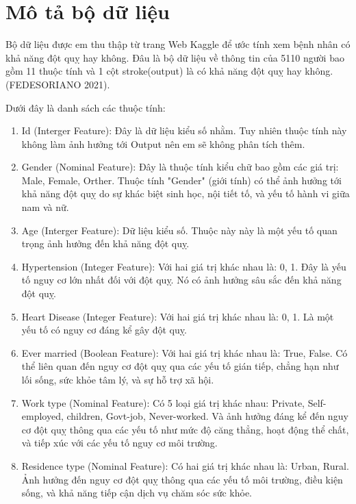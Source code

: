 \documentclass[11pt]{article}
\begin{document}
	
	\pagebreak
		
	
	\section{Mô tả bộ dữ liệu}
	
	
	Bộ dữ liệu được em thu thập từ trang Web Kaggle để ước tính xem bệnh nhân có khả năng đột quỵ hay không. Đâu là bộ dữ liệu về thông tin của 5110 người bao gồm 11 thuộc tính và 1 cột stroke(output) là có khả năng đột quỵ hay không. (FEDESORIANO 2021). 
	
	Dưới đây là danh sách các thuộc tính:
	\begin{enumerate}
		\item Id (Interger Feature): Đây là dữ liệu kiểu số nhằm. Tuy nhiên thuộc tính này không làm ảnh hưởng tới Output nên em sẽ không phân tích thêm.
		\item Gender (Nominal Feature): Đây là thuộc tính kiểu chữ bao gồm các giá trị: Male, Female, Orther. Thuộc tính "Gender" (giới tính) có thể ảnh hưởng tới khả năng đột quỵ do sự khác biệt sinh học, nội tiết tố, và yếu tố hành vi giữa nam và nữ.
		\item Age (Interger Feature): Dữ liệu kiểu số. Thuộc này này là một yếu tố quan trọng ảnh hưởng đến khả năng đột quỵ.
		\item Hypertension (Integer Feature): Với hai giá trị khác nhau là: 0, 1.
		Đây là yếu tố nguy cơ lớn nhất đối với đột quỵ. Nó có ảnh hưởng sâu sắc đến khả năng đột quỵ.
		\item Heart Disease (Integer Feature): Với hai giá trị khác nhau là: 0, 1. Là một yếu tố có nguy cơ đáng kể gây đột quỵ. 
		\item Ever married (Boolean Feature): Với hai giá trị khác nhau là: True, False. Có thể liên quan đến nguy cơ đột quỵ qua các yếu tố gián tiếp, chẳng hạn như lối sống, sức khỏe tâm lý, và sự hỗ trợ xã hội.
		\item Work type (Nominal Feature): Có 5 loại giá trị khác nhau: Private, Self-employed, children, Govt-job, Never-worked. Và ảnh hưởng đáng kể đến nguy cơ đột quỵ thông qua các yếu tố như mức độ căng thẳng, hoạt động thể chất, và tiếp xúc với các yếu tố nguy cơ môi trường.
		\item Residence type (Nominal Feature): Có hai giá trị khác nhau là: Urban, Rural. Ảnh hưởng đến nguy cơ đột quỵ thông qua các yếu tố môi trường, điều kiện sống, và khả năng tiếp cận dịch vụ chăm sóc sức khỏe.

\end{enumerate}
\end{document}
